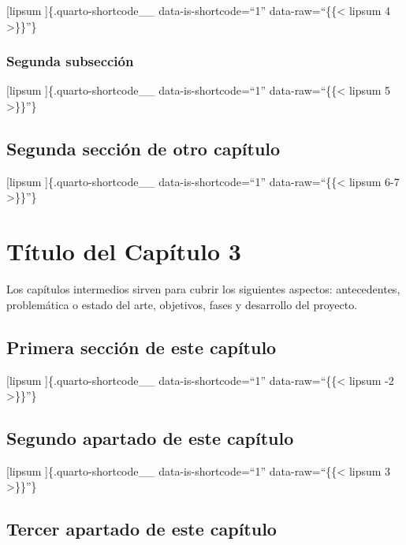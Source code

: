 \documentclass[
  letterpaper,
  DIV=11,
  numbers=noendperiod]{scrreprt}
\begin{document}
\noindent [lipsum {} {]}\{.quarto-shortcode\_\_ data-is-shortcode=``1''
data-raw=``\{\{\textless{} lipsum 4 \textgreater\}\}''\}

\subsection{Segunda subsección}\label{segunda-subsecciuxf3n}

\noindent [lipsum {} {]}\{.quarto-shortcode\_\_ data-is-shortcode=``1''
data-raw=``\{\{\textless{} lipsum 5 \textgreater\}\}''\}

\section{Segunda sección de otro
capítulo}\label{segunda-secciuxf3n-de-otro-capuxedtulo}

\noindent [lipsum {} {]}\{.quarto-shortcode\_\_ data-is-shortcode=``1''
data-raw=``\{\{\textless{} lipsum 6-7 \textgreater\}\}''\}


\chapter{Título del Capítulo 3}\label{ch-tres}

\noindent Los capítulos intermedios sirven para cubrir los siguientes
aspectos: antecedentes, problemática o estado del arte, objetivos, fases
y desarrollo del proyecto.

\section{Primera sección de este
capítulo}\label{primera-secciuxf3n-de-este-capuxedtulo}

\noindent [lipsum {} {]}\{.quarto-shortcode\_\_ data-is-shortcode=``1''
data-raw=``\{\{\textless{} lipsum -2 \textgreater\}\}''\}

\section{Segundo apartado de este
capítulo}\label{segundo-apartado-de-este-capuxedtulo}

\noindent [lipsum {} {]}\{.quarto-shortcode\_\_ data-is-shortcode=``1''
data-raw=``\{\{\textless{} lipsum 3 \textgreater\}\}''\}

\section{Tercer apartado de este
capítulo}\label{tercer-apartado-de-este-capuxedtulo}
\end{document}
